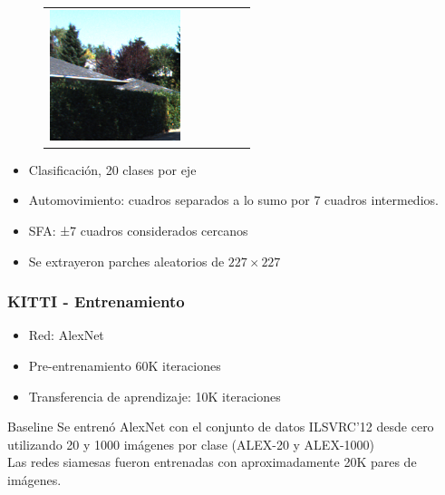 \documentclass{beamer}
\begin{document}
\begin{frame}
\begin{figure}
{\begin{tabular}{cccccc}
\includegraphics[width = 1.5in]{./images/kitti/c1.png}\\
\end{tabular}
}
\label{fig:kitti-sample}
\end{figure}
\vfill
\begin{itemize}
    \item Clasificación, 20 clases por eje
    \item Automovimiento: cuadros separados a lo sumo por 7 cuadros intermedios.
    \item SFA: ±7 cuadros considerados cercanos
    \item Se extrayeron parches aleatorios de \(227 \times 227\)
\end{itemize}
\vfill
\end{frame}





\begin{frame}[plain]
\frametitle{KITTI - Entrenamiento}
\vfill
\begin{itemize}
    \item Red: AlexNet
    \item Pre-entrenamiento 60K iteraciones
    \item Transferencia de aprendizaje: 10K iteraciones
\end{itemize}\pause
\vfill
\begin{block}{Baseline}
Se entrenó AlexNet con el conjunto de datos ILSVRC'12 desde cero utilizando 20 y 1000 imágenes por clase (ALEX-20 y ALEX-1000)\\
Las redes siamesas fueron entrenadas con aproximadamente 20K pares de imágenes.
\end{block}\pause
\vfill
\end{frame}
\end{document}
